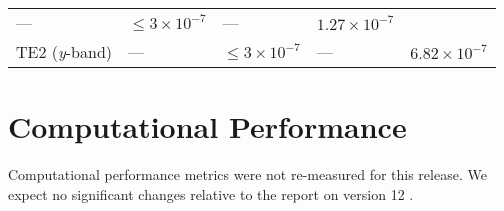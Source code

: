 \documentclass[DM,toc]{lsstdoc}
\begin{document}
\begin{longtable}[]{@{}lllll@{}}
\begin{minipage}[t]{0.05\columnwidth}
---\strut
\end{minipage} & \begin{minipage}[t]{0.24\columnwidth}\raggedright\strut
\(\leq 3\times 10^{-7}\)\strut
\end{minipage} & \begin{minipage}[t]{0.21\columnwidth}\raggedright\strut
---\strut
\end{minipage} & \begin{minipage}[t]{0.22\columnwidth}\raggedright\strut
\(1.27\times 10^{-7}\)\strut
\end{minipage}\tabularnewline
\begin{minipage}[t]{0.13\columnwidth}\raggedright\strut
TE2 (\emph{y}-band)\strut
\end{minipage} & \begin{minipage}[t]{0.05\columnwidth}\raggedright\strut
---\strut
\end{minipage} & \begin{minipage}[t]{0.24\columnwidth}\raggedright\strut
\(\leq 3\times 10^{-7}\)\strut
\end{minipage} & \begin{minipage}[t]{0.21\columnwidth}\raggedright\strut
---\strut
\end{minipage} & \begin{minipage}[t]{0.22\columnwidth}\raggedright\strut
\(6.82\times 10^{-7}\)\strut
\end{minipage}\tabularnewline
\bottomrule
\end{longtable}

\section{Computational Performance}\label{computational-performance}

Computational performance metrics were not re-measured for this release.
We expect no significant changes relative to the
report on version 12 .



\end{document}
